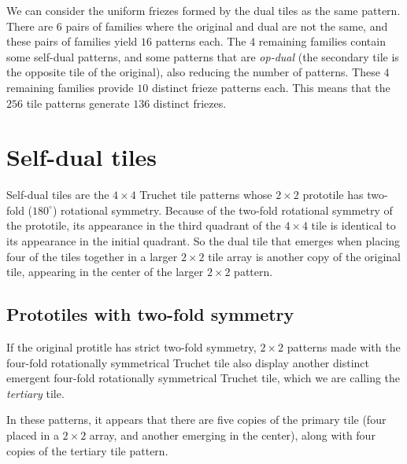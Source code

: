 \documentclass{tufte-book}
\begin{document}
\vspace{0.5cm}
\noindent
We can consider the uniform friezes formed by the dual tiles as the same pattern. There are $6$ pairs of families where the original and dual are not the same, and these pairs of families yield $16$ patterns each. The $4$ remaining families contain some self-dual patterns, and some patterns that are \textit{op-dual} (the secondary tile is the opposite tile of the original), also reducing the number of patterns. These $4$ remaining families provide $10$ distinct frieze patterns each. This means that the $256$ tile patterns generate $136$ distinct friezes. 

\vspace{0.5cm}
\noindent

\noindent
\newpage



\chapter{Self-dual tiles}

\noindent
Self-dual tiles are the $4\times 4$ Truchet tile patterns whose $2\times 2$ prototile has two-fold ($180^{\circ}$) rotational symmetry. Because of the two-fold rotational symmetry of the prototile, its appearance in the third quadrant of the $4\times 4$ tile is identical to its appearance in the initial quadrant. So the dual tile that emerges when placing four of the tiles together in a larger $2\times 2$ tile array is another copy of the original tile, appearing in the center of the  larger $2\times 2$ pattern. 

\section{Prototiles with two-fold symmetry}

If the original protitle has strict two-fold symmetry,  $2\times 2$ patterns made with the four-fold rotationally symmetrical Truchet tile also display another distinct emergent four-fold rotationally symmetrical Truchet tile, which we are calling the \textit{tertiary} tile. 

\noindent
In these patterns, it appears that there are five copies of the primary tile (four placed in a $2\times 2$ array, and another emerging in the center), along with four copies of the tertiary tile pattern.

{
\setlength{\tabcolsep}{0pt}
\renewcommand{\arraystretch}{0}

}
\end{document}
